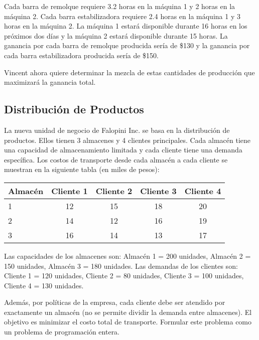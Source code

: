 \documentclass[12pt]{article}
\begin{document}
\vspace{0.5em}

Cada barra de remolque requiere 3.2 horas en la máquina 1 y 2 horas en la máquina 2. Cada barra estabilizadora requiere 2.4 horas en la máquina 1 y 3 horas en la máquina 2. La máquina 1 estará disponible durante 16 horas en los próximos dos días y la máquina 2 estará disponible durante 15 horas. La ganancia por cada barra de remolque producida sería de \$130 y la ganancia por cada barra estabilizadora producida sería de \$150.

\vspace{0.5em}

Vincent ahora quiere determinar la mezcla de estas cantidades de producción que maximizará la ganancia total.

\subsection{Distribución de Productos}
La nueva unidad de negocio de Falopini Inc. se basa en la distribución de productos. Ellos tienen 3 almacenes y 4 clientes principales. Cada almacén tiene una capacidad de almacenamiento limitada y cada cliente tiene una demanda específica. Los costos de transporte desde cada almacén a cada cliente se muestran en la siguiente tabla (en miles de pesos):

\begin{table}[h]
\centering
\begin{tabular}{lcccc}
\toprule
\textbf{Almacén} & \textbf{Cliente 1} & \textbf{Cliente 2} & \textbf{Cliente 3} & \textbf{Cliente 4} \\
\midrule
1 & 12 & 15 & 18 & 20 \\
2 & 14 & 12 & 16 & 19 \\
3 & 16 & 14 & 13 & 17 \\
\bottomrule
\end{tabular}
\end{table}

Las capacidades de los almacenes son: Almacén 1 = 200 unidades, Almacén 2 = 150 unidades, Almacén 3 = 180 unidades. Las demandas de los clientes son: Cliente 1 = 120 unidades, Cliente 2 = 80 unidades, Cliente 3 = 100 unidades, Cliente 4 = 130 unidades.

\vspace{0.5em}

Además, por políticas de la empresa, cada cliente debe ser atendido por exactamente un almacén (no se permite dividir la demanda entre almacenes). El objetivo es minimizar el costo total de transporte. Formular este problema como un problema de programación entera.
\end{document}
